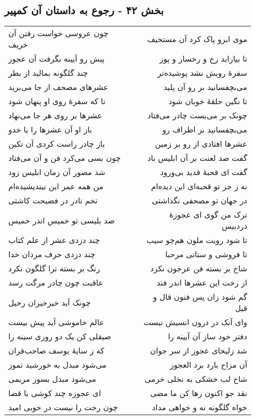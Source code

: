 \begin{center}
\section*{بخش ۴۲ - رجوع به داستان آن کمپیر}
\label{sec:sh042}
\begin{longtable}{l p{0.5cm} r}
چون عروسی خواست رفتن آن خریف
&&
موی ابرو پاک کرد آن مستخیف
\\
پیش رو آیینه بگرفت آن عجوز
&&
تا بیاراید رخ و رخسار و پوز
\\
چند گلگونه بمالید از بطر
&&
سفرهٔ رویش نشد پوشیده‌تر
\\
عشرهای مصحف از جا می‌برید
&&
می‌بچفسانید بر رو آن پلید
\\
تا که سفرهٔ روی او پنهان شود
&&
تا نگین حلقهٔ خوبان شود
\\
عشرها بر روی هر جا می‌نهاد
&&
چونک بر می‌بست چادر می‌فتاد
\\
باز او آن عشرها را با خدو
&&
می‌بچفسانید بر اطراف رو
\\
باز چادر راست کردی آن تکین
&&
عشرها افتادی از رو بر زمین
\\
چون بسی می‌کرد فن و آن می‌فتاد
&&
گفت صد لعنت بر آن ابلیس باد
\\
شد مصور آن زمان ابلیس زود
&&
گفت ای قحبهٔ قدید بی‌ورود
\\
من همه عمر این نیندیشیده‌ام
&&
نه ز جز تو قحبه‌ای این دیده‌ام
\\
تخم نادر در فضیحت کاشتی
&&
در جهان تو مصحفی نگذاشتی
\\
صد بلیسی تو خمیس اندر خمیس
&&
ترک من گوی ای عجوزهٔ دردبیس
\\
چند دزدی عشر از علم کتاب
&&
تا شود رویت ملون هم‌چو سیب
\\
چند دزدی حرف مردان خدا
&&
تا فروشی و ستانی مرحبا
\\
رنگ بر بسته ترا گلگون نکرد
&&
شاخ بر بسته فن عرجون نکرد
\\
عاقبت چون چادر مرگت رسد
&&
از رخت این عشرها اندر فتد
\\
چونک آید خیزخیزان رحیل
&&
گم شود زان پس فنون قال و قیل
\\
عالم خاموشی آید پیش بیست
&&
وای آنک در درون انسیش نیست
\\
صیقلی کن یک دو روزی سینه را
&&
دفتر خود ساز آن آیینه را
\\
که ز سایهٔ یوسف صاحب‌قران
&&
شد زلیخای عجوز از سر جوان
\\
می‌شود مبدل به خورشید تموز
&&
آن مزاح بارد برد العجوز
\\
می‌شود مبدل بسوز مریمی
&&
شاخ لب خشکی به نخلی خرمی
\\
ای عجوزه چند کوشی با قضا
&&
نقد جو اکنون رها کن ما مضی
\\
چون رخت را نیست در خوبی امید
&&
خواه گلگونه نه و خواهی مداد
\\
\end{longtable}
\end{center}
